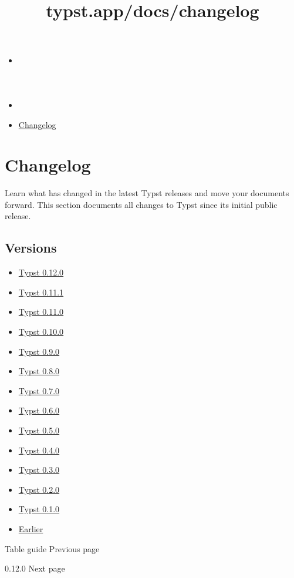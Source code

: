 \title{typst.app/docs/changelog}

\begin{itemize}
\tightlist
\item
  \href{/docs}{}
\item
  
\item
  \href{/docs/changelog/}{Changelog}
\end{itemize}

\section{Changelog}\label{changelog}

Learn what has changed in the latest Typst releases and move your
documents forward. This section documents all changes to Typst since its
initial public release.

\subsection{Versions}\label{versions}

\begin{itemize}
\tightlist
\item
  \href{/docs/changelog/0.12.0/}{Typst 0.12.0}
\item
  \href{/docs/changelog/0.11.1/}{Typst 0.11.1}
\item
  \href{/docs/changelog/0.11.0/}{Typst 0.11.0}
\item
  \href{/docs/changelog/0.10.0/}{Typst 0.10.0}
\item
  \href{/docs/changelog/0.9.0/}{Typst 0.9.0}
\item
  \href{/docs/changelog/0.8.0/}{Typst 0.8.0}
\item
  \href{/docs/changelog/0.7.0/}{Typst 0.7.0}
\item
  \href{/docs/changelog/0.6.0/}{Typst 0.6.0}
\item
  \href{/docs/changelog/0.5.0/}{Typst 0.5.0}
\item
  \href{/docs/changelog/0.4.0/}{Typst 0.4.0}
\item
  \href{/docs/changelog/0.3.0/}{Typst 0.3.0}
\item
  \href{/docs/changelog/0.2.0/}{Typst 0.2.0}
\item
  \href{/docs/changelog/0.1.0/}{Typst 0.1.0}
\item
  \href{/docs/changelog/earlier/}{Earlier}
\end{itemize}

\href{/docs/guides/table-guide/}{\pandocbounded{}}

{ Table guide } { Previous page }

\href{/docs/changelog/0.12.0/}{\pandocbounded{}}

{ 0.12.0 } { Next page }
